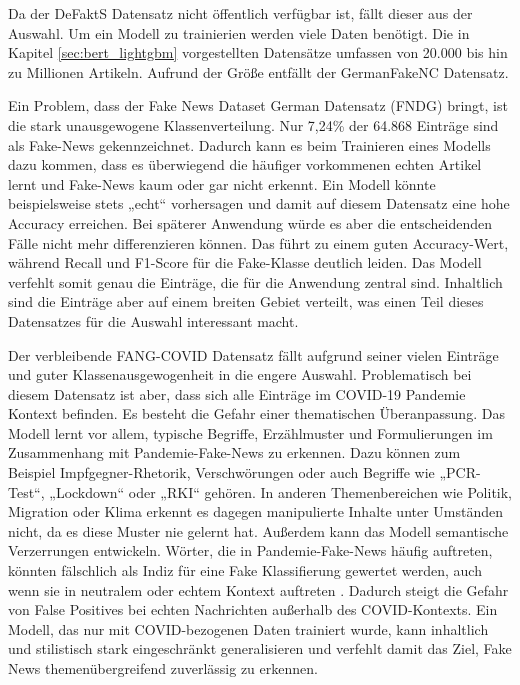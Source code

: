 Da der DeFaktS Datensatz nicht öffentlich verfügbar ist, fällt dieser aus der Auswahl. 
Um ein Modell zu trainierien werden viele Daten benötigt. Die in Kapitel \ref{sec:bert_lightgbm} vorgestellten Datensätze umfassen von 20.000 bis hin zu Millionen Artikeln.
Aufrund der Größe entfällt der GermanFakeNC Datensatz.

Ein Problem, dass der Fake News Dataset German Datensatz (FNDG) bringt, ist die stark unausgewogene Klassenverteilung. Nur 7,24\% der 64.868 Einträge sind 
als Fake-News gekennzeichnet. Dadurch kann es beim Trainieren eines Modells dazu kommen, dass es überwiegend die häufiger vorkommenen echten Artikel 
lernt und Fake-News kaum oder gar nicht erkennt. 
Ein Modell könnte beispielsweise stets „echt“ vorhersagen und damit auf diesem Datensatz eine hohe Accuracy erreichen.
Bei späterer Anwendung würde es aber die entscheidenden Fälle nicht mehr differenzieren können. 
Das führt zu einem guten Accuracy-Wert, während Recall und F1-Score für die Fake-Klasse deutlich leiden. 
Das Modell verfehlt somit genau die Einträge, die für die Anwendung zentral sind.
Inhaltlich sind die Einträge aber auf einem breiten Gebiet verteilt, was einen Teil dieses Datensatzes für die Auswahl interessant macht.

Der verbleibende FANG-COVID Datensatz \cite{mattern-etal-2021-fang} fällt aufgrund seiner vielen Einträge und guter Klassenausgewogenheit
in die engere Auswahl. Problematisch bei diesem Datensatz ist aber, dass sich alle Einträge im COVID-19 Pandemie Kontext befinden.
Es besteht die Gefahr einer thematischen Überanpassung. Das Modell lernt vor allem, typische Begriffe, Erzählmuster und 
Formulierungen im Zusammenhang mit Pandemie-Fake-News zu erkennen. Dazu können zum Beispiel Impfgegner-Rhetorik, Verschwörungen oder auch Begriffe 
wie „PCR-Test“, „Lockdown“ oder „RKI“ gehören. In anderen Themenbereichen wie Politik, Migration oder Klima erkennt es dagegen manipulierte Inhalte 
unter Umständen nicht, da es diese Muster nie gelernt hat.
Außerdem kann das Modell semantische Verzerrungen entwickeln. Wörter, die in Pandemie-Fake-News häufig auftreten, könnten fälschlich als 
Indiz für eine Fake Klassifierung gewertet werden, auch wenn sie in neutralem oder echtem Kontext auftreten \cite{chen2023, nan2022improvingfakenewsdetection}. 
Dadurch steigt die Gefahr von False Positives bei echten Nachrichten außerhalb des COVID-Kontexts.
Ein Modell, das nur mit COVID-bezogenen Daten trainiert wurde, kann inhaltlich und stilistisch stark eingeschränkt generalisieren und 
verfehlt damit das Ziel, Fake News themenübergreifend zuverlässig zu erkennen.

